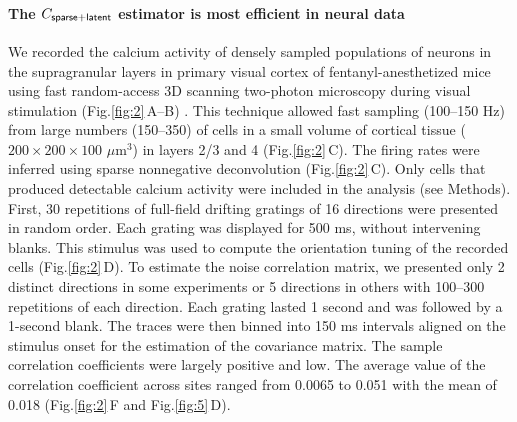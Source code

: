 \documentclass[10pt]{article}
\newcommand{\figref}[2]{Fig.\;\ref{fig:#1}\,#2}
\begin{document}
\paragraph{The $C_{\sf sparse+latent}$ estimator is most efficient in neural data}
We recorded the calcium activity of densely sampled populations of neurons in the supragranular layers in primary visual cortex of fentanyl-anesthetized mice using fast random-access 3D scanning two-photon microscopy during visual stimulation (\figref{2}{A--B}) \cite{Reddy:2005, Katona:2012, Cotton:2013}. This technique allowed fast sampling (100--150 Hz) from large numbers (150--350) of cells in a small volume of cortical tissue ($200\times200\times100$ $\mu$m$^3$) in layers 2/3 and 4 (\figref{2}{C}).  The firing rates were inferred using sparse nonnegative deconvolution \cite{Vogelstein:2010} (\figref{2}{C}). Only cells that produced detectable calcium activity were included in the analysis (see Methods).  First, 30 repetitions of full-field drifting gratings of 16 directions were presented in random order.  Each grating was displayed for 500 ms, without intervening blanks.  This stimulus was used to compute the orientation tuning of the recorded cells (\figref{2}{D}). To estimate the noise correlation matrix, we presented only 2 distinct directions in some experiments or 5 directions in others with 100--300 repetitions of each direction. Each grating lasted 1 second and was followed by a 1-second blank.  The traces were then binned into 150 ms intervals aligned on the stimulus onset for the estimation of the covariance matrix.   The sample correlation coefficients were largely positive and low. The average value of the correlation coefficient across sites ranged from 0.0065 to 0.051 with the mean of 0.018 (\figref{2}{F} and \figref{5}{D}).  
\end{document}
